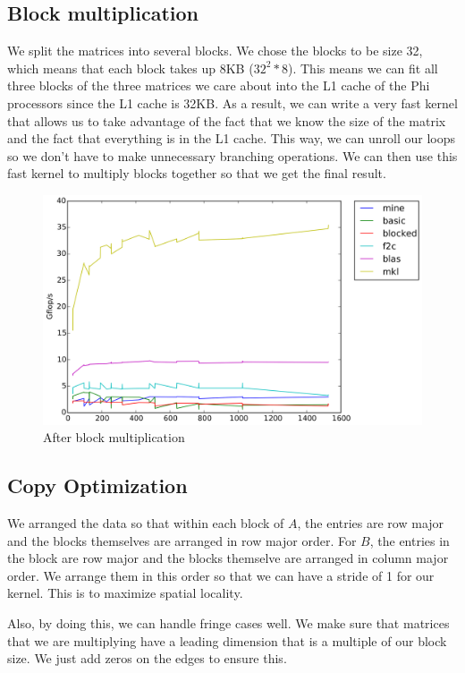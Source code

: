 \documentclass[11pt]{article}
\begin{document}
   		\subsection{Block multiplication}
   		We split the matrices into several blocks. We chose the blocks to be size 32, which means that each block takes up 8KB ($32^2 * 8$). This means we can fit all three blocks of the three matrices we care about into the L1 cache of the Phi processors since the L1 cache is 32KB. As a result, we can write a very fast kernel that allows us to take advantage of the fact that we know the size of the matrix and the fact that everything is in the L1 cache. This way, we can unroll our loops so we don't have to make unnecessary branching operations. We can then use this fast kernel to multiply blocks together so that we get the final result.
   		
   		\begin{figure}[H]
   			\centering
   			\includegraphics[width=4.5in]{timing_32.png}
   			\caption{After block multiplication}
   		\end{figure}
   		
		\clearpage
   		
    
   		
   		\subsection{Copy Optimization}
   		We arranged the data so that within each block of $A$, the entries are row major and the blocks themselves are arranged in row major order. For $B$, the entries in the block are row major and the blocks themselve are arranged in column major order. We arrange them in this order so that we can have a stride of 1 for our kernel. This is to maximize spatial locality.
   		
   		Also, by doing this, we can handle fringe cases well. We make sure that matrices that we are multiplying have a leading dimension that is a multiple of our block size. We just add zeros on the edges to ensure this.
	    
\end{document}
